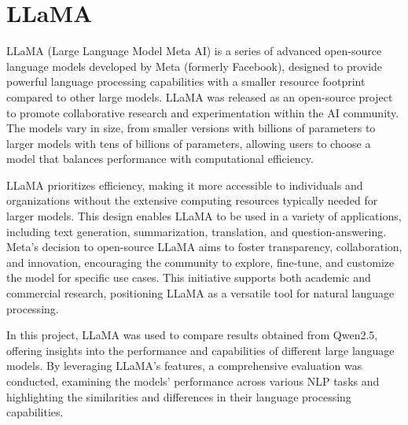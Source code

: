 \section{LLaMA}

LLaMA (Large Language Model Meta AI) is a series of advanced open-source language models developed by Meta (formerly Facebook), designed to provide powerful language processing capabilities with a smaller resource footprint compared to other large models. LLaMA was released as an open-source project to promote collaborative research and experimentation within the AI community. The models vary in size, from smaller versions with billions of parameters to larger models with tens of billions of parameters, allowing users to choose a model that balances performance with computational efficiency.

LLaMA prioritizes efficiency, making it more accessible to individuals and organizations without the extensive computing resources typically needed for larger models. This design enables LLaMA to be used in a variety of applications, including text generation, summarization, translation, and question-answering. Meta's decision to open-source LLaMA aims to foster transparency, collaboration, and innovation, encouraging the community to explore, fine-tune, and customize the model for specific use cases. This initiative supports both academic and commercial research, positioning LLaMA as a versatile tool for natural language processing.

In this project, LLaMA was used to compare results obtained from Qwen2.5, offering insights into the performance and capabilities of different large language models. By leveraging LLaMA's features, a comprehensive evaluation was conducted, examining the models' performance across various NLP tasks and highlighting the similarities and differences in their language processing capabilities.
